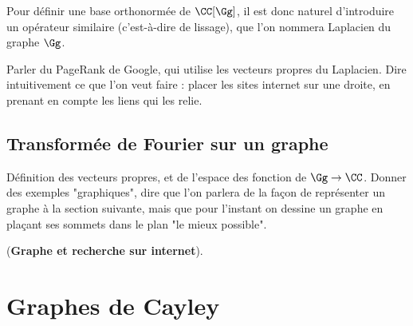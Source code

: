 \paraspace
Pour définir une base orthonormée de $\CC[\Gg]$, il est donc naturel d'introduire un opérateur similaire (c'est-à-dire de lissage), que l'on nommera Laplacien du graphe $\Gg$.
\mathspace{}
\begin{defn}
\label{defn-laplacien-graphe}

\end{defn}\noindent

\mathspace{}
\begin{prop}
\label{prop-laplacien-graphe}
Parler du PageRank de Google, qui utilise les vecteurs propres du Laplacien. Dire intuitivement ce que l'on veut faire : placer les sites internet sur une droite, en prenant en compte les liens qui les relie.
\end{prop}\noindent

\subsection{Transformée de Fourier sur un graphe}
\label{sect2-transfo-fourier-graphe} 

Définition des vecteurs propres, et de l'espace des fonction de $\Gg \rightarrow \CC$. Donner des exemples "graphiques", dire que l'on parlera de la façon de représenter un graphe à la section suivante, mais que pour l'instant on dessine un graphe en plaçant ses sommets dans le plan "le mieux possible".
\mathspace{}
\begin{rem} {(\upshape\textbf{Graphe et recherche sur internet}).} 

\end{rem}\noindent

\section{Graphes de Cayley}
\label{sect1-graphes-cayley} 


